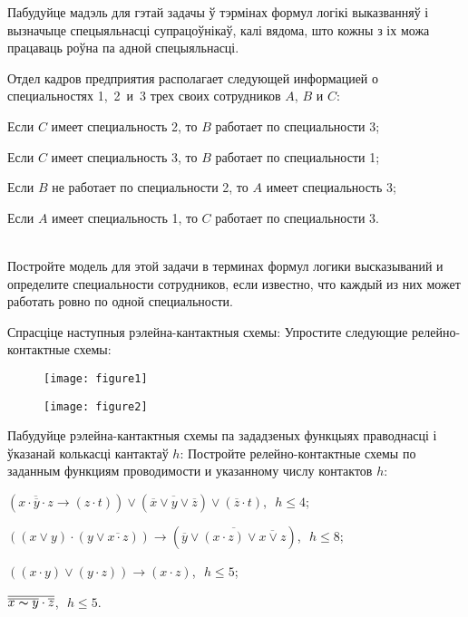 \begin{problemList}
{Пабудуйце мадэль для гэтай задачы ў тэрмінах формул логікі выказванняў і вызначыце спецыяльнасці супрацоўнікаў,
калі вядома, што кожны з іх можа працаваць роўна па адной спецыяльнасці.
}
{%
Отдел кадров предприятия располагает следующей информацией о специальностях 1,~2~и~3 трех своих сотрудников $A$, $B$ и $C$:
\begin{russianEnumerate}
    \item Если $C$ имеет специальность 2, то $B$ работает по специальности 3;
    \item Если $C$ имеет специальность 3, то $B$ работает по специальности 1;
    \item Если $B$ не работает по специальности 2, то $A$ имеет специальность 3;
    \item Если $A$ имеет специальность 1, то $C$ работает по специальности 3.
\end{russianEnumerate}\\
Постройте модель для этой задачи в терминах формул логики высказываний и определите  специальности сотрудников,
если известно, что каждый из них может работать ровно по  одной специальности.
}

\bigskip

\problemItemWithCommonPart
{Спрасціце наступныя рэлейна-кантактныя схемы:}
{Упростите следующие релейно-контактные схемы:}
{%
\begin{figure}[H]
    \begin{center}
        \texttt{[image: figure1]}
    \end{center}
\end{figure}

\begin{figure}[H]
    \begin{center}
        \texttt{[image: figure2]}
    \end{center}
\end{figure}
}

\problemItemWithCommonPart
{Пабудуйце рэлейна-кантактныя схемы па зададзеных функцыях праводнасці і ўказанай колькасці кантактаў $h$:}
{Постройте релейно-контактные схемы по заданным функциям проводимости и указанному числу контактов $h$:}
{%
\begin{belarusianEnumerate}
    \item $(\overline{x \cdot \overline{y} \cdot z} \to (z \cdot t)) \vee
    (\overline{\overline{x} \vee y \vee \overline{z}}) \vee (\overline{z} \cdot t)$,\,\, $h \le 4$;
    \item $((x \vee y) \cdot (y \vee \overline{x \cdot z})) \to (\overline{\overline{y} \vee
    (x \cdot z) \vee \overline{x \vee z}})$,\,\, $h \le 8$;
    \item $((x \cdot y) \vee (y \cdot z)) \to (x \cdot z)$,\,\, $h \le 5$;
    \item $\overline{\overline{x \thicksim y} \cdot \overline{z}}$,\,\, $h \le 5$.
\end{belarusianEnumerate}
}


\end{problemList}
